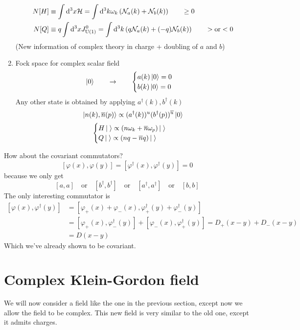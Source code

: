 \begin{enumerate}
\begin{align*}
N[H] &\equiv \int \operatorname{d \!}{^3x}\mathcal{H} = \int \operatorname{d \!}{^3k}\omega_k \left(\mathcal{N}_a(k) + \mathcal{N}_b(k)\right) \qquad \geq 0 \\
N[Q] &\equiv q\int \operatorname{d \!}{^3x}J^{0}_{\operatorname{U}(1)} = \int \operatorname{d \!}{^3k} \left(q\mathcal{N}_a(k)+ (-q)\mathcal{N}_b(k)\right) \qquad > \text{or} < 0
\end{align*}
(New information of complex theory in charge + doubling of $a$ and $b$)
\item Fock space for complex scalar field
\[ \left| 0 \right\rangle \qquad \to \qquad \begin{cases}
a(k)\left| 0 \right\rangle = 0 \\ b(k)\left| 0 \right\rangle = 0
\end{cases} \]
Any other state is obtained by applying $a^\dagger(k), b^\dagger(k)$
\[ \left| n(k), \overline{n}(p) \right\rangle \propto (a^\dagger(k))^u(b^\dagger(p))^{\overline{u}}\left| 0 \right\rangle \]
\[ \begin{cases}
H\left| \; \right\rangle \propto (n\omega_k + \overline{n}\omega_p)\left| \; \right\rangle \\
Q\left| \; \right\rangle \propto (nq- \overline{n}q)\left| \; \right\rangle
\end{cases} \]
\end{enumerate}

How about the covariant commutators?
\[ \left[\varphi(x), \varphi(y)\right] = \left[\varphi^\dagger(x),\varphi^\dagger(y)\right] = 0 \]
because we only get
\[ \left[a,a\right] \quad \text{or} \quad \left[b^\dagger,b^\dagger\right] \quad \text{or} \quad \left[a^\dagger,a^\dagger\right] \quad\text{or} \quad \left[b,b\right] \]
The only interesting commutator is
\begin{align*}
\left[\varphi(x), \varphi^\dagger(y)\right] &= \left[\varphi_+(x) + \varphi_-(x), \varphi^\dagger_+(y) + \varphi^\dagger_-(y)\right] \\
&= \left[\varphi_+(x), \varphi_-^\dagger(y)\right] + \left[\varphi_-(x), \varphi_+^\dagger(y)\right] = D_+(x-y) + D_-(x-y) \\
&= D(x-y)
\end{align*}
Which we've already shown to be covariant.


\section{Complex Klein-Gordon field}
We will now consider a field like the one in the previous section, except now we allow the field to be complex. This new field is very similar to the old one, except it admits charges.

